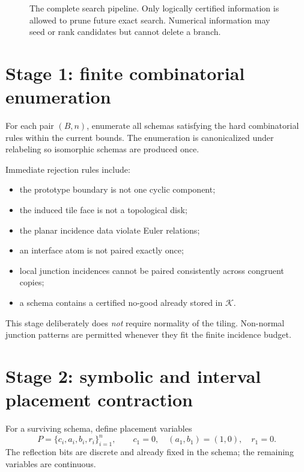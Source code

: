\documentclass[11pt]{article}
\newcommand{\KB}{\mathcal K}
\begin{document}
\begin{figure}[p]
{%
}
\caption{The complete search pipeline. Only logically certified information is allowed to prune future exact search. Numerical information may seed or rank candidates but cannot delete a branch.}
\label{fig:pipeline}
\end{figure}

\section{Stage 1: finite combinatorial enumeration}

For each pair $(B,n)$, enumerate all schemas satisfying the hard combinatorial rules within the current bounds. The enumeration is canonicalized under relabeling so isomorphic schemas are produced once.

Immediate rejection rules include:
\begin{itemize}[leftmargin=7mm]
\item the prototype boundary is not one cyclic component;
\item the induced tile face is not a topological disk;
\item the planar incidence data violate Euler relations;
\item an interface atom is not paired exactly once;
\item local junction incidences cannot be paired consistently across congruent copies;
\item a schema contains a certified no-good already stored in $\KB$.
\end{itemize}

This stage deliberately does \emph{not} require normality of the tiling. Non-normal junction patterns are permitted whenever they fit the finite incidence budget.

\section{Stage 2: symbolic and interval placement contraction}

For a surviving schema, define placement variables
\[
P=\{c_i,a_i,b_i,r_i\}_{i=1}^n,
\qquad c_1=0,\quad (a_1,b_1)=(1,0),\quad r_1=0.
\]
The reflection bits are discrete and already fixed in the schema; the remaining variables are continuous.
\end{document}
